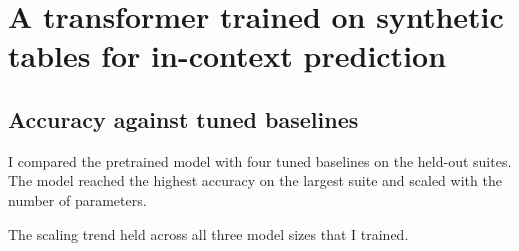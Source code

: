 \chapter{A transformer trained on synthetic tables for in-context prediction}\label{ch:method}

\section{Accuracy against tuned baselines}\label{sec:accuracy}
I compared the pretrained model with four tuned baselines on the held-out suites.
The model reached the highest accuracy on the largest suite and scaled with the number of parameters.


The scaling trend held across all three model sizes that I trained.
